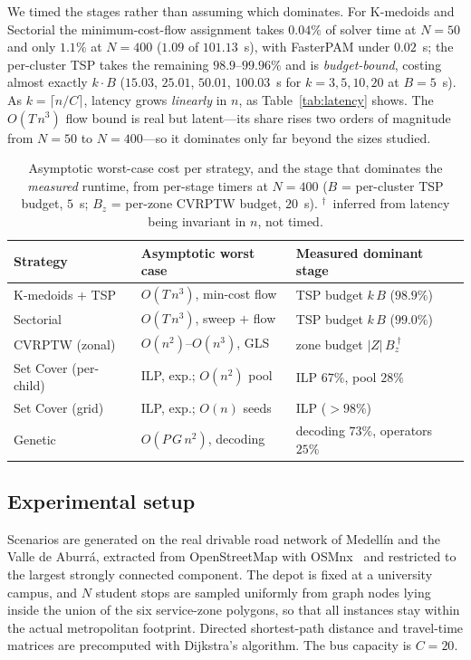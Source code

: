 \documentclass[runningheads]{llncs}
\begin{document}
We timed the stages rather than assuming which dominates. For K-medoids
and Sectorial the minimum-cost-flow assignment takes $0.04\%$ of solver
time at $N=50$ and only $1.1\%$ at $N=400$ ($1.09$ of $101.13$~s), with
FasterPAM under $0.02$~s; the per-cluster TSP takes the remaining
$98.9$--$99.96\%$ and is \emph{budget-bound}, costing almost exactly
$k\cdot B$ ($15.03$, $25.01$, $50.01$, $100.03$~s for $k=3,5,10,20$ at
$B=5$~s). As $k=\lceil n/C\rceil$, latency grows \emph{linearly} in $n$,
as Table~\ref{tab:latency} shows. The $O(T\,n^3)$ flow bound is real but
latent---its share rises two orders of magnitude from $N=50$ to
$N=400$---so it dominates only far beyond the sizes studied.

\begin{table}[t]
\centering
\caption{Asymptotic worst-case cost per strategy, and the stage that
dominates the \emph{measured} runtime, from per-stage timers at $N{=}400$
($B$ = per-cluster TSP budget, $5$~s; $B_z$ = per-zone CVRPTW budget,
$20$~s). $^\dagger$~inferred from latency being invariant in $n$, not timed.}
\label{tab:complexity}
\small
\setlength{\tabcolsep}{4pt}
\begin{tabular}{lll}
\toprule
\textbf{Strategy} & \textbf{Asymptotic worst case} &
\textbf{Measured dominant stage}\\
\midrule
K-medoids + TSP & $O(T\,n^3)$, min-cost flow & TSP budget $k\,B$ ($98.9\%$)\\
Sectorial       & $O(T\,n^3)$, sweep $+$ flow & TSP budget $k\,B$ ($99.0\%$)\\
CVRPTW (zonal)  & $O(n^2)$--$O(n^3)$, GLS & zone budget $|Z|\,B_z^{\;\dagger}$\\
Set Cover (per-child) & ILP, exp.; $O(n^2)$ pool & ILP $67\%$, pool $28\%$\\
Set Cover (grid)      & ILP, exp.; $O(n)$ seeds & ILP ($>98\%$)\\
Genetic & $O(P\,G\,n^2)$, decoding & decoding $73\%$, operators $25\%$\\
\bottomrule
\end{tabular}
\end{table}

\subsection{Experimental setup}\label{sec:setup}
Scenarios are generated on the real drivable road network of
Medell\'in and the Valle de Aburr\'a, extracted from OpenStreetMap with
OSMnx~\cite{Boeing2017OSMnx} and restricted to the largest strongly
connected component. The depot is fixed at a university campus, and
$N$ student stops are sampled uniformly from graph nodes lying inside
the union of the six service-zone polygons, so that all instances stay
within the actual metropolitan footprint. Directed shortest-path
distance and travel-time matrices are precomputed with Dijkstra's
algorithm. The bus capacity is $C=20$.
\end{document}
